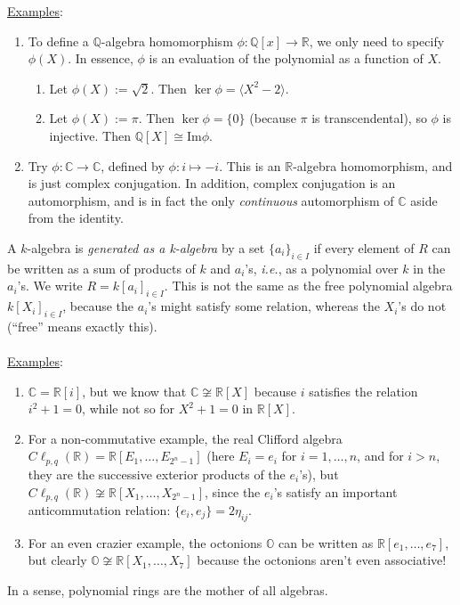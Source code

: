 \documentclass[12pt]{article}
\newcommand{\q}{\mathbb{Q}}
\newcommand{\cx}{\mathbb{C}}
\newcommand{\real}{\mathbb{R}}
\newcommand{\ita}[1]{\textit{#1}}
\newcommand{\vbrack}[1]{\langle #1\rangle}
\theoremstyle{definition}
\begin{document}
\underline{Examples}: 
\begin{enumerate}
    \item To define a $\q$-algebra homomorphism $\phi:\q[x]\to\real$, we only need to specify $\phi(X)$. In essence, $\phi$ is an evaluation of the polynomial as a function of $X$.
    \begin{enumerate}
        \item Let $\phi(X):=\sqrt{2}$. Then $\ker\phi=\vbrack{X^2-2}$.
        \item Let $\phi(X):=\pi$. Then $\ker\phi=\{0\}$ (because $\pi$ is transcendental), so $\phi$ is injective. Then $\q[X]\cong\text{Im}\phi$.
    \end{enumerate}
    \item Try $\phi:\cx\to\cx$, defined by $\phi:i\mapsto-i$. This is an $\real$-algebra homomorphism, and is just complex conjugation. In addition, complex conjugation is an automorphism, and is in fact the only \ita{continuous} automorphism of $\cx$ aside from the identity.
\end{enumerate}
A $k$-algebra is \ita{generated as a k-algebra} by a set $\{a_i\}_{i\in I}$ if every element of $R$ can be written as a sum of products of $k$ and $a_i$'s, \ita{i.e.}, as a polynomial over $k$ in the $a_i$'s. We write $R=k[a_i]_{i\in I}$. This is not the same as the free polynomial algebra $k[X_i]_{i\in I}$, because the $a_i$'s might satisfy some relation, whereas the $X_i$'s do not (``free'' means exactly this). \\\\
\underline{Examples}: 
\begin{enumerate}
    \item $\cx=\real[i]$, but we know that $\cx\not\cong\real[X]$ because $i$ satisfies the relation $i^2+1=0$, while not so for $X^2+1=0$ in $\real[X]$.
    \item For a non-commutative example, the real Clifford algebra $C\ell_{p,q}(\real)=\real[E_1,\dotsc,E_{2^n-1}]$ (here $E_i=e_i$ for $i=1,\dotsc,n$, and for $i>n$, they are the successive exterior products of the $e_i$'s), but $C\ell_{p,q}(\real)\not\cong\real[X_1,\dotsc,X_{2^n-1}]$, since the $e_i$'s satisfy an important anticommutation relation: $\{e_i,e_j\}=2\eta_{ij}$. 
    \item For an even crazier example, the octonions $\mathbb{O}$ can be written as $\real[e_1,\dotsc,e_7]$, but clearly $\mathbb{O}\not\cong\real[X_1,\dotsc,X_7]$ because the octonions aren't even associative!
\end{enumerate}
In a sense, polynomial rings are the mother of all algebras.\\\\
\end{document}
